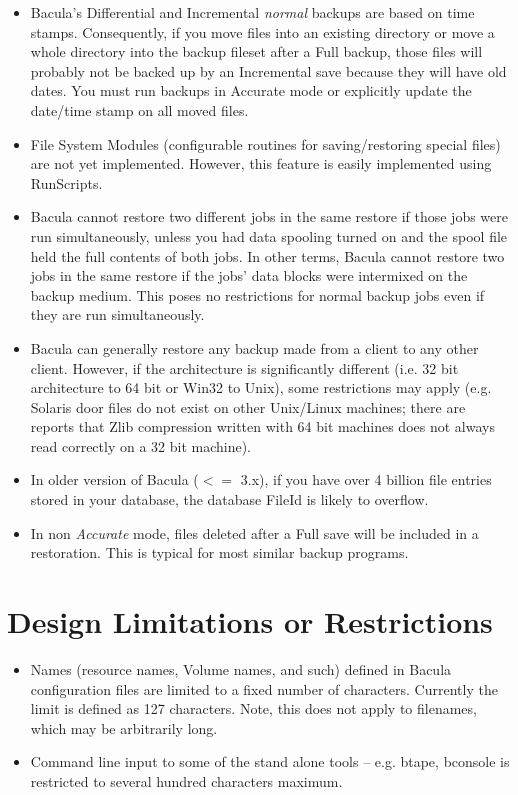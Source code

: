 \begin{itemize}
\item Bacula's Differential and Incremental \textsl{normal} backups are based
  on time stamps.  Consequently, if you move files into an existing directory
  or move a whole directory into the backup fileset after a Full backup, those
  files will probably not be backed up by an Incremental save because they will
  have old dates.  You must run backups in Accurate mode or explicitly update
  the date/time stamp on all moved files. %
\item File System Modules (configurable routines for
   saving/restoring special files) are not yet implemented.  However,
   this feature is easily implemented using RunScripts.
\item Bacula cannot restore two different jobs in the same
   restore if those jobs were run simultaneously, unless you had
   data spooling turned on and the spool file held the full
   contents of both jobs. In other terms, Bacula cannot restore
   two jobs in the same restore if the jobs' data blocks were
   intermixed on the backup medium. This poses no restrictions
   for normal backup jobs even if they are run simultaneously.
\item Bacula can generally restore any backup made from a client
   to any other client. However, if the architecture is significantly
   different (i.e. 32 bit architecture to 64 bit or Win32 to Unix),
   some restrictions may apply (e.g. Solaris door files do not exist
   on other Unix/Linux machines; there are reports that Zlib compression
   written with 64 bit machines does not always read correctly on a 32 bit
   machine).
\item In older version of Bacula ($<=$ 3.x), if you have over 4 billion file
  entries stored in your database, the database FileId is likely to overflow.
\item In non \textsl{Accurate} mode, files deleted after a Full save will be
  included in a restoration. This is typical for most similar backup programs.
\end{itemize}

\section{Design Limitations or Restrictions}

\begin{itemize}
\item Names (resource names, Volume names, and such) defined in Bacula 
   configuration files are limited to a fixed number of
   characters.  Currently the limit is defined as 127 characters.  Note,
   this does not apply to filenames, which may be arbitrarily long.
\item Command line input to some of the stand alone tools -- e.g. btape,
   bconsole is restricted to several hundred characters maximum.
\end{itemize}
